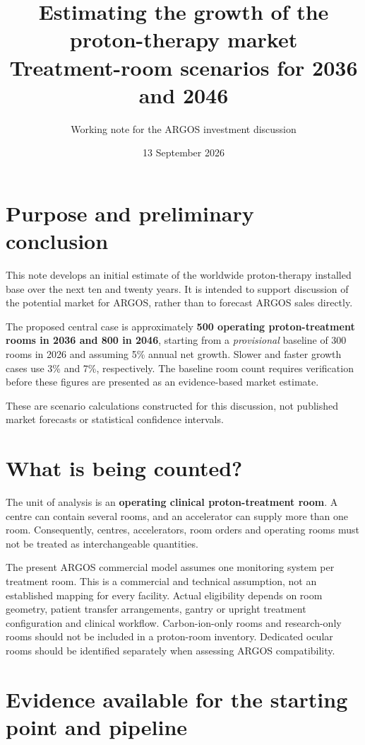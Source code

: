 \documentclass[11pt,a4paper]{article}
\title{Estimating the growth of the proton-therapy market\\
\large Treatment-room scenarios for 2036 and 2046}
\author{Working note for the ARGOS investment discussion}
\date{13 September 2026}
\begin{document}
\maketitle

\section{Purpose and preliminary conclusion}

This note develops an initial estimate of the worldwide proton-therapy
installed base over the next ten and twenty years. It is intended to support
discussion of the potential market for ARGOS, rather than to forecast ARGOS
sales directly.

The proposed central case is approximately \textbf{500 operating proton-treatment
rooms in 2036 and 800 in 2046}, starting from a \emph{provisional} baseline of
300 rooms in 2026 and assuming 5\% annual net growth. Slower and faster growth
cases use 3\% and 7\%, respectively. The baseline room count requires verification
before these figures are presented as an evidence-based market estimate.

These are scenario calculations constructed for this discussion, not published
market forecasts or statistical confidence intervals.

\section{What is being counted?}

The unit of analysis is an \textbf{operating clinical proton-treatment room}.
A centre can contain several rooms, and an accelerator can supply more than
one room. Consequently, centres, accelerators, room orders and operating rooms
must not be treated as interchangeable quantities.

The present ARGOS commercial model assumes one monitoring system per treatment
room. This is a commercial and technical assumption, not an established mapping
for every facility. Actual eligibility depends on room geometry, patient
transfer arrangements, gantry or upright treatment configuration and clinical
workflow. Carbon-ion-only rooms and research-only rooms should not be included
in a proton-room inventory. Dedicated ocular rooms should be identified
separately when assessing ARGOS compatibility.

\section{Evidence available for the starting point and pipeline}
\end{document}
